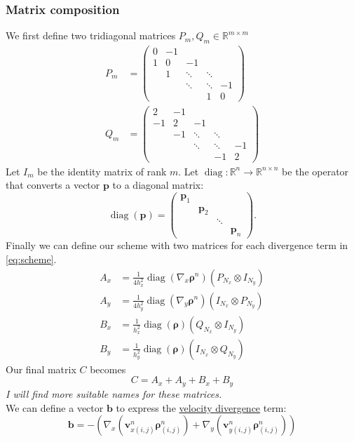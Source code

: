 \documentclass{article}
\DeclareMathOperator{\diag}{diag}
\renewcommand{\vec}[1]{\mathbf{#1}}
\newcommand{\gvec}[1]{\boldsymbol#1}
\begin{document}
\subsubsection{Matrix composition}
We first define two tridiagonal matrices $P_{m},Q_{m}\in \mathbb{R}^{m\times m}$
\begin{align*}
	P_{m} &= \begin{pmatrix}
		0 & -1 &  & &  \\
		1 & 0 & -1 &   &  \\
		  & 1 & \ddots & \ddots &  \\
		  &  & \ddots & \ddots &-1 \\
		 & &  & 1 & 0
	\end{pmatrix}\\
	Q_{m} &= \begin{pmatrix}
		2 & -1 &  & &  \\
		-1 & 2 & -1 &   &  \\
		  & -1 & \ddots & \ddots &  \\
		  &  & \ddots & \ddots &-1 \\
		 & &  & -1 & 2
	\end{pmatrix}
\end{align*}
Let $I_m$ be the identity matrix of rank $m$. Let $\diag:\mathbb{R}^n\rightarrow\mathbb{R}^{n\times n}$ be the operator that converts a vector $\vec{p}$ to a diagonal matrix:
\begin{equation}
	\diag(\vec{p}) = \begin{pmatrix}
		\vec{p}_1\\
		&\vec{p}_2\\
		&&\ddots\\
		&&&\vec{p}_n
	\end{pmatrix}.
	\label{def:diag}
\end{equation}
Finally we can define our scheme with two matrices for each divergence term in \eqref{eq:scheme}.
\begin{align*}
	A_x &= \frac{1}{4h_x^2}\diag(\nabla_x\gvec{\rho}^n)(P_{N_x}\otimes I_{N_y})\\
	A_y &= \frac{1}{4h_y^2}\diag(\nabla_y\gvec{\rho}^n)(I_{N_x}\otimes P_{N_y})\\
	B_x &= \frac{1}{h_x^2}\diag(\gvec{\rho})(Q_{N_x}\otimes I_{N_y})\\
	B_y &= \frac{1}{h_y^2}\diag(\gvec{\rho})(I_{N_x}\otimes Q_{N_y})
\end{align*}
Our final matrix $C$ becomes 
\begin{equation}
	C = A_x + A_y + B_x + B_y 
	\label{eq:total_matrix}
\end{equation}
\emph{I will find more suitable names for these matrices.}
\ \\
We can define a vector $\vec{b}$ to express the \underline{velocity divergence} term:
\begin{equation}
	\vec{b} = -\left( \nabla_x(\vec{v}^n_{x(i,j)}\gvec{\rho}^n_{(i,j)}) + \nabla_y(\vec{v}^n_{y(i,j)}\gvec{\rho}^n_{(i,j)})\right)
	\label{def:vector}
\end{equation}
\end{document}

